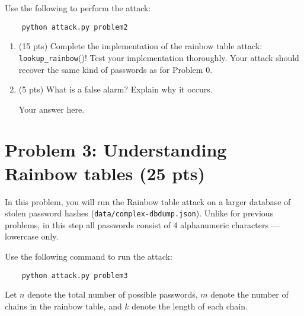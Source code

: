\documentclass[11pt,letterpaper]{article}
\newenvironment{answer}{\em \color{blue} \begin{adjustwidth}{1cm}{1cm}}{\end{adjustwidth}}
\begin{document}
Use the following to perform the attack:
%
\begin{Verbatim}
	python attack.py problem2
\end{Verbatim}
%

%
\begin{enumerate}
	\item (15 pts) Complete the implementation of the rainbow table attack: \texttt{lookup\_rainbow}()! Test your implementation thoroughly. Your attack should recover the same kind of passwords as for Problem 0.
	
	
	\item (5 pts) What is a false alarm? Explain why it occurs.
	
	\begin{answer}
	
		Your answer here.
		
	\end{answer}

\end{enumerate}

\newpage
\section*{Problem 3: Understanding Rainbow tables (25 pts)}
%

In this problem, you will run the Rainbow table attack on a larger database of stolen password hashes (\texttt{data/complex-dbdump.json}). Unlike for previous problems, in this step all passwords consist of 4 alphanumeric characters --- lowercase only.

Use the following command to run the attack:
%
\begin{Verbatim}
	python attack.py problem3
\end{Verbatim}
%

Let $n$ denote the total number of possible passwords, $m$ denote the number of chains in the rainbow table, and $k$ denote the length of each chain.
\end{document}
